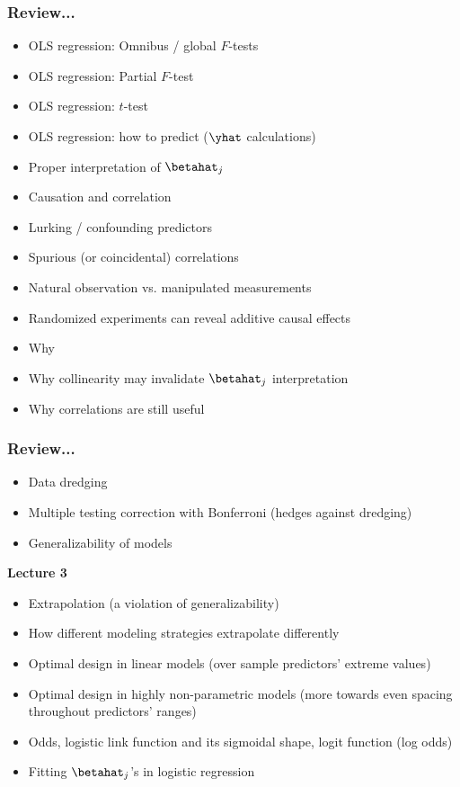 \documentclass[handout]{beamer}
\begin{document}
\begin{frame}\frametitle{Review...}

\begin{itemize}
\item OLS regression: Omnibus / global $F$-tests
\item OLS regression: Partial $F$-test
\item OLS regression: $t$-test
\item OLS regression: how to predict ($\yhat$ calculations)
\item Proper interpretation of $\betahat_j$
\item Causation and correlation
\item Lurking / confounding predictors
\item Spurious (or coincidental) correlations
\item Natural observation vs. manipulated measurements
\item Randomized experiments can reveal additive causal effects
\item Why 
\item Why collinearity may invalidate $\betahat_j$ interpretation
\item Why correlations are still useful
\end{itemize}
	
\end{frame}

\begin{frame}\frametitle{Review...}

\begin{itemize}
\item Data dredging
\item Multiple testing correction with Bonferroni (hedges against dredging)
\item Generalizability of models
\end{itemize}
	
\textbf{Lecture 3}

\begin{itemize}
\item Extrapolation (a violation of generalizability)
\item How different modeling strategies extrapolate differently
\item Optimal design in linear models (over sample predictors' extreme values)
\item Optimal design in highly non-parametric models (more towards even spacing throughout predictors' ranges)
\item Odds, logistic link function and its sigmoidal shape, logit function (log odds)
\item Fitting $\betahat_j$'s in logistic regression
\end{itemize}

\end{frame}
\end{document}
